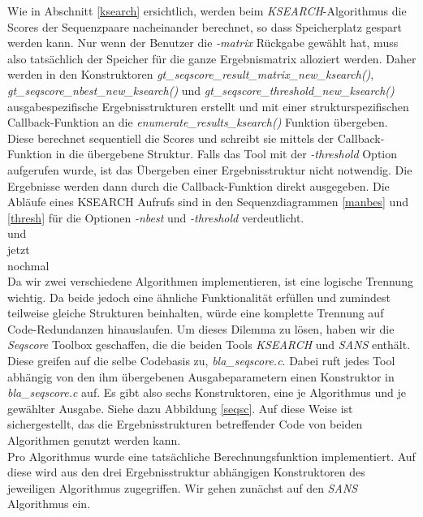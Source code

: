 \documentclass{article}
\begin{document}
Wie in Abschnitt \ref{ksearch} ersichtlich, werden beim \emph{KSEARCH}-Algorithmus die Scores der Sequenzpaare nacheinander berechnet, so dass Speicherplatz gespart werden kann. Nur wenn der Benutzer die \emph{-matrix} Rückgabe gewählt hat, muss also tatsächlich der Speicher für die ganze Ergebnismatrix alloziert werden. Daher werden in den Konstruktoren \emph{gt\_seqscore\_result\_matrix\_new\_ksearch()}, \emph{gt\_seqscore\_nbest\_new\_ksearch()} und  \emph{gt\_seqscore\_threshold\_new\_ksearch()} ausgabespezifische Ergebnisstrukturen erstellt und mit einer strukturspezifischen Callback-Funktion an 
die \emph{enumerate\_results\_ksearch()} Funktion übergeben. Diese berechnet sequentiell die Scores und schreibt sie mittels der Callback-Funktion in die übergebene Struktur. Falls das Tool mit der \emph{-threshold} Option aufgerufen wurde, ist das Übergeben einer Ergebnisstruktur nicht notwendig. Die Ergebnisse werden dann durch die Callback-Funktion direkt ausgegeben. Die Abläufe eines KSEARCH Aufrufs sind in den Sequenzdiagrammen \ref{manbes} und \ref{thresh} für die Optionen \emph{-nbest} und \emph{-threshold} verdeutlicht. \\

und\\
jetzt\\
nochmal\\

Da wir zwei verschiedene Algorithmen implementieren, ist eine logische Trennung wichtig. Da beide jedoch eine ähnliche Funktionalität erfüllen und
zumindest teilweise gleiche Strukturen beinhalten, würde eine komplette Trennung auf Code-Redundanzen hinauslaufen. Um dieses Dilemma zu lösen, haben wir
die \emph{Seqscore} Toolbox geschaffen, die die beiden Tools \emph{KSEARCH} und \emph{SANS} enthält. Diese greifen auf die selbe Codebasis zu, 
\emph{bla\_seqscore.c}. Dabei ruft jedes Tool abhängig von den ihm übergebenen Ausgabeparametern einen Konstruktor in \emph{bla\_seqscore.c} auf. Es gibt also
sechs Konstruktoren, eine je Algorithmus und je gewählter Ausgabe. Siehe dazu Abbildung \ref{seqsc}. Auf diese Weise ist sichergestellt, das die 
Ergebnisstrukturen betreffender Code von beiden Algorithmen genutzt werden kann.\\
Pro Algorithmus wurde eine tatsächliche Berechnungsfunktion implementiert. Auf diese wird aus den drei Ergebnisstruktur abhängigen Konstruktoren des jeweiligen
Algorithmus zugegriffen. Wir gehen zunächst auf den \emph{SANS} Algorithmus ein.
\end{document}
